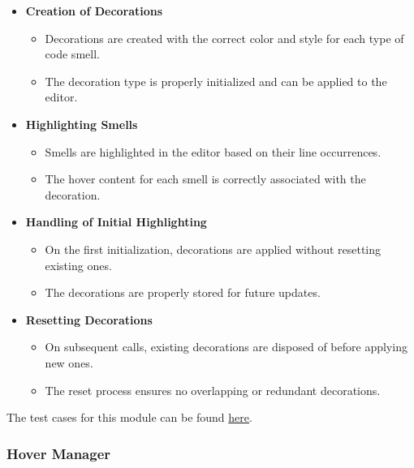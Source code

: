 \documentclass[12pt, titlepage]{article}
\begin{document}
  \begin{itemize}
    \item \textbf{Creation of Decorations}
      \begin{itemize}
        \item Decorations are created with the correct color and
          style for each type of code smell.
        \item The decoration type is properly initialized and can be
          applied to the editor.
      \end{itemize}

    \item \textbf{Highlighting Smells}
      \begin{itemize}
        \item Smells are highlighted in the editor based on their
          line occurrences.
        \item The hover content for each smell is correctly
          associated with the decoration.
      \end{itemize}

    \item \textbf{Handling of Initial Highlighting}
      \begin{itemize}
        \item On the first initialization, decorations are applied
          without resetting existing ones.
        \item The decorations are properly stored for future updates.
      \end{itemize}

    \item \textbf{Resetting Decorations}
      \begin{itemize}
        \item On subsequent calls, existing decorations are disposed
          of before applying new ones.
        \item The reset process ensures no overlapping or redundant decorations.
      \end{itemize}
  \end{itemize}

  \noindent The test cases for this module can be found
  \href{https://github.com/ssm-lab/capstone--sco-vs-code-plugin/blob/plugin-multi-file/test/ui/fileHighlighter.test.ts}{here}.

  \subsubsection{Hover Manager}
\end{document}
